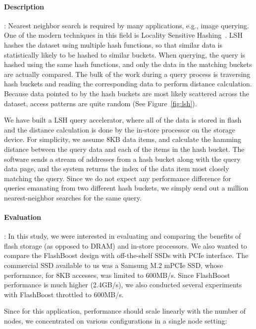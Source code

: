 \paragraph{Description} :
Nearest neighbor search is required by many applications, e.g., image querying. One of
the modern techniques in this field is Locality Sensitive Hashing~\cite{lsh}.
LSH hashes the dataset using multiple hash functions, so that
similar data is statistically likely to be hashed to similar buckets. When
querying, the query is hashed using the same hash functions, and only the data
in the matching buckets are actually compared. The bulk of the work during a
query process is traversing hash buckets and reading the corresponding data to
perform distance calculation. Because data pointed to by the hash buckets are
most likely scattered across the dataset, access patterns are quite random (See Figure~\ref{fig:lsh}).




We have built a LSH query accelerator, where all of the data is stored in flash
and the distance calculation is done by the in-store processor on the storage
device. For simplicity, we assume 8KB data items, and calculate the hamming
distance between the query data and each of the items in the hash bucket. The
software sends a stream of addresses from a hash bucket along with the query
data page, and the system returns the index of the data item most closely matching the
query. Since we do not expect any performance difference for queries emanating from two different hash buckets, we simply send out a million nearest-neighbor searches for the same query.

\paragraph{Evaluation} :
In this study, we were interested in evaluating and comparing the benefits of flash storage (as opposed to DRAM) and in-store processors. 
We also wanted to compare the FlashBoost design with off-the-shelf SSDs with PCIe interface. The commercial SSD available to us was a Samsung M.2 mPCIe SSD, whose performance, for 8KB accesses, was limited to 600MB/s. Since FlashBoost performance is much higher (2.4GB/s), we also conducted several experiments with FlashBoost throttled to 600MB/s. 

Since for this application, performance should scale linearly with the number of nodes, we concentrated on various configurations in a single node setting:

